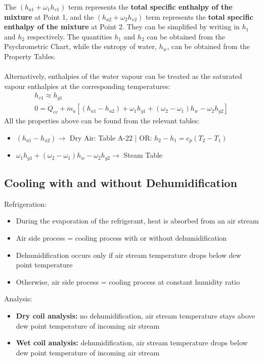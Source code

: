 \documentclass[class=report, crop=false, 12pt,a4paper]{standalone}
\numberwithin{equation}{section}
\begin{document}
The $(h_{a1} + \omega_1h_{v1})$ term represents the \textbf{total specific enthalpy of the mixture} at Point 1, and the $(h_{a2} + \omega_2h_{v2})$ term represents the \textbf{total specific enthalpy of the mixture} at Point 2. They can be simplified by writing in $h_1$ and $h_2$ respectively. The quantities $h_1$ and $h_2$ can be obtained from the Psychrometric Chart, while the entropy of water, $h_w$, can be obtained from the Property Tables. \\\\
Alternatively, enthalpies of the water vapour can be treated as the saturated vapour enthalpies at the corresponding temperatures:
\begin{gather}
  h_{v1} \approx h_{g1} \\[5pt]
  0 = \dot{Q}_{cv} + \dot{m}_{a}\left[(h_{a1} - h_{a2}) + \omega_1h_{g1} + (\omega_2-\omega_1)h_{w} - \omega_2h_{g2}\right] 
\end{gather}
All the properties above can be found from the relevant tables:
\begin{itemize}
  \item $(h_{a1} - h_{a2}) \longrightarrow$ Dry Air: Table A-22 | OR: $h_2-h_1 = c_p(T_2-T_1)$
  \item $\omega_1h_{g1} + (\omega_2-\omega_1)h_{w} - \omega_2h_{g2} \longrightarrow$ Steam Table
\end{itemize}
\subsection{Cooling with and without Dehumidification}
Refrigeration:
\begin{itemize}[noitemsep]
  \item During the evaporation of the refrigerant, heat is absorbed from an air stream
  \item Air side process = cooling process with or without dehumidification
  \item Dehumidification occurs only if air stream temperature drops below dew point temperature
  \item Otherwise, air side process = cooling process at constant humidity ratio
\end{itemize}
Analysis:
\begin{itemize}[noitemsep]
  \item \textbf{Dry coil analysis:} no dehumidification, air stream temperature stays above dew point temperature of incoming air stream
  \item \textbf{Wet coil analysis:} dehumidification, air stream temperature drops below dew point temperature of incoming air stream
\end{itemize}
\end{document}
